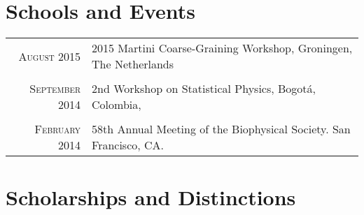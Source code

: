 \documentclass[a4paper,10pt]{article} %
\begin{document}
\color{OrangeRed}
\section{Schools and Events}
\color{black}

\begin{tabular}{rl}

\textsc{August 2015} & 2015 Martini Coarse-Graining Workshop, Groningen, The Netherlands \\
&\\

\textsc{September 2014} &  2nd Workshop on Statistical Physics, Bogotá, Colombia, \\
&\\

\textsc{February 2014} &  58th Annual Meeting of the Biophysical Society. San Francisco, CA. \\

\end{tabular}



\color{OrangeRed}
\section{Scholarships and Distinctions}
\color{black}
\end{document}
